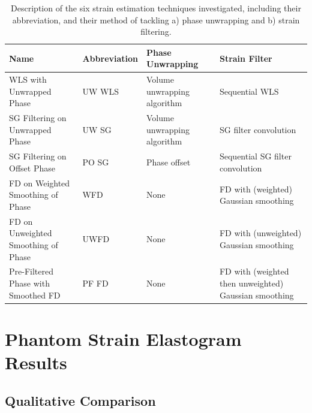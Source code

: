 \begin{table}[h!]
	\centering
	\begin{tabularx}{\textwidth}{YlYY}
		\toprule
		Name & Abbreviation & Phase Unwrapping & Strain Filter \\
		\midrule
		WLS with Unwrapped Phase & UW WLS & Volume unwrapping algorithm & Sequential WLS \\
		SG Filtering on Unwrapped Phase & UW SG & Volume unwrapping algorithm & SG filter convolution \\
		SG Filtering on Offset Phase & PO SG & Phase offset & Sequential SG filter convolution \\
		FD on Weighted Smoothing of Phase & WFD & None & FD with (weighted) Gaussian smoothing \\
		FD on Unweighted Smoothing of Phase & UWFD & None & FD with (unweighted) Gaussian smoothing \\
		Pre-Filtered Phase with Smoothed FD & PF FD & None & FD with (weighted then unweighted) Gaussian smoothing \\
		\bottomrule
	\end{tabularx}
	\caption{Description of the six strain estimation techniques investigated, including their abbreviation, and their method of tackling a) phase unwrapping and b) strain filtering.}
	\label{strain_methods}

\end{table}

\section{Phantom Strain Elastogram Results}\label{phantom_results}

\subsection{Qualitative Comparison}

